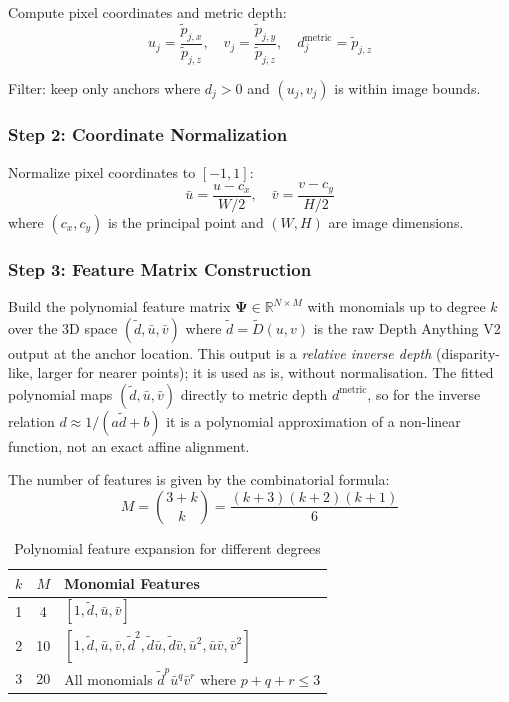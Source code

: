 \documentclass[11pt,a4paper]{article}
\begin{document}
Compute pixel coordinates and metric depth:
\begin{equation}
u_j = \frac{\tilde{p}_{j,x}}{\tilde{p}_{j,z}}, \quad
v_j = \frac{\tilde{p}_{j,y}}{\tilde{p}_{j,z}}, \quad
d_j^{\text{metric}} = \tilde{p}_{j,z}
\end{equation}

Filter: keep only anchors where $d_j > 0$ and $(u_j, v_j)$ is within image bounds.

\subsubsection{Step 2: Coordinate Normalization}

Normalize pixel coordinates to $[-1, 1]$:
\begin{equation}
\bar{u} = \frac{u - c_x}{W/2}, \quad \bar{v} = \frac{v - c_y}{H/2}
\label{eq:normalize}
\end{equation}
where $(c_x, c_y)$ is the principal point and $(W, H)$ are image dimensions.

\subsubsection{Step 3: Feature Matrix Construction}

Build the polynomial feature matrix $\boldsymbol{\Psi} \in \mathbb{R}^{N \times M}$ with monomials up to degree $k$ over the 3D space $(\tilde{d}, \bar{u}, \bar{v})$ where $\tilde{d} = \tilde{D}(u, v)$ is the raw Depth Anything V2 output at the anchor location. This output is a \emph{relative inverse depth} (disparity-like, larger for nearer points); it is used as is, without normalisation. The fitted polynomial maps $(\tilde{d}, \bar{u}, \bar{v})$ directly to metric depth $d^{\text{metric}}$, so for the inverse relation $d \approx 1/(a\tilde{d}+b)$ it is a polynomial approximation of a non-linear function, not an exact affine alignment.

The number of features is given by the combinatorial formula:
\begin{equation}
M = \binom{3 + k}{k} = \frac{(k+3)(k+2)(k+1)}{6}
\end{equation}

\begin{table}[h]
\centering
\caption{Polynomial feature expansion for different degrees}
\begin{tabular}{ccl}
\toprule
$k$ & $M$ & Monomial Features \\
\midrule
1 & 4 & $[1, \tilde{d}, \bar{u}, \bar{v}]$ \\
2 & 10 & $[1, \tilde{d}, \bar{u}, \bar{v}, \tilde{d}^2, \tilde{d}\bar{u}, \tilde{d}\bar{v}, \bar{u}^2, \bar{u}\bar{v}, \bar{v}^2]$ \\
3 & 20 & All monomials $\tilde{d}^p \bar{u}^q \bar{v}^r$ where $p+q+r \leq 3$ \\
\bottomrule
\end{tabular}
\label{tab:features}
\end{table}
\end{document}
